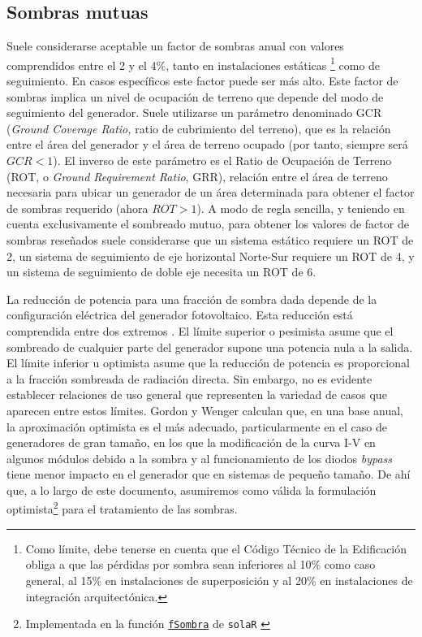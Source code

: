 \subsection{Sombras mutuas\label{sub:Sombras-mutuas}}

Suele considerarse aceptable un factor de sombras anual con valores
comprendidos entre el 2 y el 4\%, tanto en instalaciones estáticas%
\footnote{Como límite, debe tenerse en cuenta que el Código Técnico de la Edificación
\citep{CodigoTecnico2006} obliga a que las pérdidas por sombra sean
inferiores al 10\% como caso general, al 15\% en instalaciones de
superposición y al 20\% en instalaciones de integración arquitectónica.%
} como de seguimiento. En casos específicos este factor puede ser más
alto. Este factor de sombras implica un nivel de ocupación de terreno
que depende del modo de seguimiento del generador. Suele utilizarse
un parámetro denominado GCR (\emph{Ground Coverage Ratio,} ratio de
cubrimiento del terreno), que es la relación entre el área del generador
y el área de terreno ocupado (por tanto, siempre será $GCR<1$). El
inverso de este parámetro es el Ratio de Ocupación de Terreno (ROT, o
\emph{Ground Requirement Ratio}, GRR),
relación entre el área de terreno necesaria para ubicar un generador
de un área determinada para obtener el factor de sombras requerido
(ahora $ROT>1$).
A modo de regla sencilla, y teniendo en cuenta exclusivamente el sombreado
mutuo, para obtener los valores de factor de sombras reseñados suele
considerarse que un sistema estático requiere un ROT de 2, un sistema
de seguimiento de eje horizontal Norte-Sur requiere un ROT de 4, y
un sistema de seguimiento de doble eje necesita un ROT de 6.

La reducción de potencia para una fracción de sombra dada depende de
la configuración eléctrica del generador fotovoltaico. Esta reducción
está comprendida entre dos extremos \citep{Gordon.Wenger1991}. 
El límite superior o pesimista asume que el sombreado de cualquier
parte del generador supone una potencia nula a la salida.
El límite inferior u optimista asume que la reducción de potencia es
proporcional a la fracción sombreada de radiación directa. 
Sin embargo, no es evidente establecer relaciones de uso general que representen 
la variedad de casos que aparecen entre estos límites. 
Gordon y Wenger \citep{Gordon.Wenger1991} calculan que, en una base anual,
la aproximación optimista es el más adecuado, particularmente en el
caso de generadores de gran tamaño, en los que la modificación de la
curva I-V en algunos módulos debido a la sombra y al funcionamiento de
los diodos \emph{bypass} tiene menor impacto en el generador que en
sistemas de pequeño tamaño. De ahí que, a lo largo de este documento,
asumiremos como válida la formulación optimista\footnote{Implementada
  en la función
  \href{http://search.r-project.org/R/library/solaR/html/fSombra.html}{\texttt{fSombra}}
  de \texttt{solaR} \cite{Perpinan2012b}} para el tratamiento de
las sombras.

